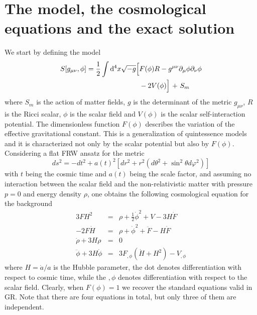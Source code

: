 \section{The model, the cosmological equations and the exact solution}
%
We start by defining the model
\begin{equation}
\begin{split}
S[g_{\mu \nu},\phi] = \frac{1}{2} \int \mathrm{d}^4x \sqrt{-g} \Bigl[& F(\phi) R -g^{\mu \nu} \partial_\mu \phi \partial_\nu \phi 
\\
& - 2 V(\phi)\Bigl] \ + \ S_m
\end{split}
\end{equation}
where $S_m$ is the action of matter fields, $g$ is the determinant of the metric $g_{\mu \nu}$, $R$ is the Ricci scalar, $\phi$ is the scalar field and $V(\phi)$ is the scalar self-interaction potential. The dimensionless function $F(\phi)$ describes the variation of the effective gravitational constant. This is a generalization of quintessence models and it is characterized not only by the scalar potential but also by $F(\phi)$. Considering a flat FRW ansatz for the metric
\begin{equation}
ds^2 = -dt^2 + a(t)^2 [d r^2 + r^2 (d \theta^2 + \sin^2 \theta d \varphi^2)]
\end{equation}
with $t$ being the cosmic time and $a(t)$ being the scale factor, and assuming no interaction between the scalar field and the non-relativistic matter
with pressure $p=0$ and energy density $\rho$, one obtains the following cosmological equation for the background \cite{leandros1,leandros2}
\begin{eqnarray}
3 F H^2 & = & \rho + \frac{1}{2} \dot{\phi}^2 + V - 3 H \dot{F} \\
-2 F \dot{H} & = & \rho + \dot{\phi}^2 + \ddot{F} - H \dot{F} \\
\dot{\rho} + 3 H \rho & = & 0 \\
\ddot{\phi} + 3 H \dot{\phi} & = & 3 F_{,\phi} (\dot{H}+H^2) - V_{,\phi}
\end{eqnarray}
%
where $H=\dot{a}/a$ is the Hubble parameter, the dot denotes differentiation with respect to cosmic time, while the $,\phi$ denotes differentiation with respect to the scalar field. 
Clearly, when $F(\phi)=1$ we recover the standard equations valid in GR.
Note that there are four equations in total, but only three of them are independent. 
